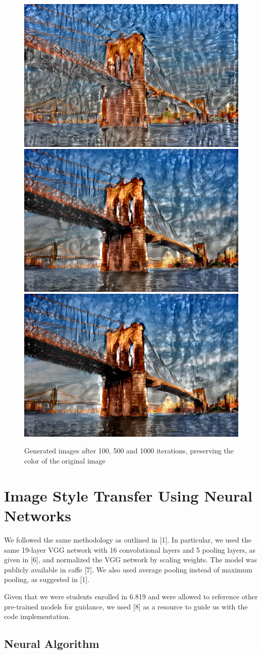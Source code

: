 \documentclass[10pt,twocolumn,letterpaper]{article}
\begin{document}
\begin{figure}
\begin{center}
\includegraphics[width=0.3\linewidth]{painted_bridge_oc/out_100.png}
\includegraphics[width=0.3\linewidth]{painted_bridge_oc/out_500.png}
\includegraphics[width=0.3\linewidth]{painted_bridge_oc/out.png}
\end{center}
   \caption{Generated images after 100, 500 and 1000 iterations, preserving the color of the original image}
\label{fig:short}
\end{figure}

\section{Image Style Transfer Using Neural Networks}

We followed the same methodology as outlined in [1]. In particular, we used the same 19-layer VGG network with 16 convolutional layers and 5 pooling layers, as given in [6], and normalized the VGG network by scaling weights. The model was publicly available in caffe [7]. We also used average pooling instead of maximum pooling, as suggested in [1].

Given that we were students enrolled in 6.819 and were allowed to reference other pre-trained models for guidance, we used [8] as a resource to guide us with the code implementation.

\subsection{Neural Algorithm}
\end{document}
